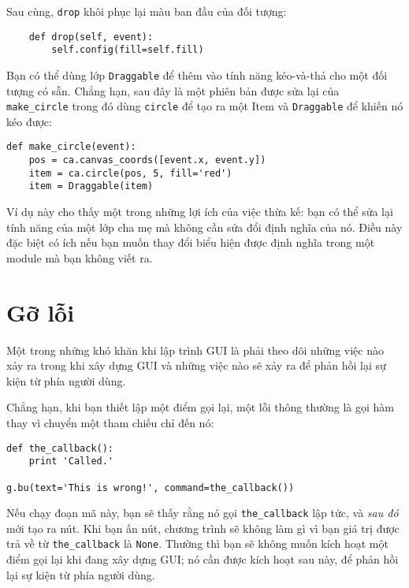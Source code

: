 \documentclass[11pt]{book}
\begin{document}

Sau cùng, {\tt drop} khôi phục lại màu ban đầu của đối tượng:

\beforeverb
\begin{verbatim}
    def drop(self, event):
        self.config(fill=self.fill)
\end{verbatim}
\afterverb
%
Bạn có thể dùng lớp {\tt Draggable} để thêm vào tính năng kéo-và-thả
cho một đối tượng có sẵn. Chẳng hạn, sau đây là một phiên bản được
sửa lại của \verb"make_circle" trong đó dùng {\tt circle} để tạo ra
một Item và {\tt Draggable} để khiến nó kéo được:

\beforeverb
\begin{verbatim}
def make_circle(event):
    pos = ca.canvas_coords([event.x, event.y])
    item = ca.circle(pos, 5, fill='red')
    item = Draggable(item)
\end{verbatim}
\afterverb
%
Ví dụ này cho thấy một trong những lợi ích của việc thừa kế: bạn có thể
sửa lại tính năng của một lớp cha mẹ mà không cần sửa đổi định nghĩa
của nó. Điều này đặc biệt có ích nếu bạn muốn thay đổi biểu hiện
được định nghĩa trong một module mà bạn không viết ra.


\section{Gỡ lỗi}

Một trong những khó khăn khi lập trình GUI là phải theo dõi
những việc nào xảy ra trong khi xây dựng GUI và những việc nào
sẽ xảy ra để phản hồi lại sự kiện từ phía người dùng.


Chẳng hạn, khi bạn thiết lập một điểm gọi lại, một lỗi thông thường là
gọi hàm thay vì chuyển một tham chiếu chỉ đến nó:

\beforeverb
\begin{verbatim}
def the_callback():
    print 'Called.'

g.bu(text='This is wrong!', command=the_callback())
\end{verbatim}
\afterverb
%
Nếu chạy đoạn mã này, bạn sẽ thấy rằng nó gọi \verb"the_callback"
lập tức, và {\em sau đó} mới tạo ra nút. Khi bạn ấn nút, chương trình
sẽ không làm gì vì bạn giá trị được trả về từ
\verb"the_callback" là {\tt None}.
Thường thì bạn sẽ không muốn kích hoạt một điểm gọi lại khi đang 
xây dựng GUI; nó cần được kích hoạt sau này, để phản hồi lại sự kiện
từ phía người dùng.
\end{document}
